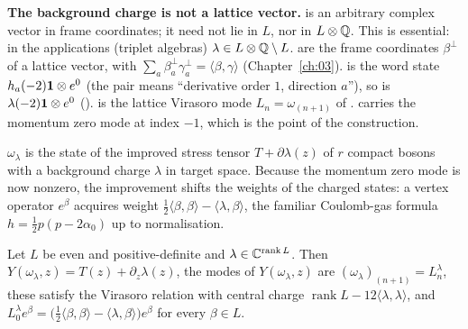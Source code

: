 \begin{dictionary}
\textbf{The background charge is not a lattice vector.}  is an arbitrary complex vector
in frame coordinates; it need not lie in $L$, nor in $L\otimes{\mathbb{Q}}$. This is essential: in the applications
(triplet algebras) $\lambda\in L\otimes{\mathbb{Q}}\setminus L$.  are the frame coordinates $\beta^\perp$
of a lattice vector, with $\sum_a\beta^\perp_a\gamma^\perp_a=\langle\beta,\gamma\rangle$ (Chapter~\ref{ch:03}).
 is the word state $h_a(-2)\mathbf{1}\otimes e^0$ (the pair  means
``derivative order $1$, direction $a$''), so  is $\lambda(-2)\mathbf{1}\otimes e^0$
().  is the lattice Virasoro mode $L_n=\omega_{(n+1)}$ of
.  carries the momentum zero mode at index $-1$, which is the point of the
construction.
\end{dictionary}

\begin{physics}
$\omega_\lambda$ is the state of the improved stress tensor $T+\partial\lambda(z)$ of $r$ compact bosons with a background
charge $\lambda$ in target space. Because the momentum zero mode is now nonzero, the improvement shifts the weights of
the charged states: a vertex operator $e^\beta$ acquires weight $\frac12\langle\beta,\beta\rangle-\langle\lambda,\beta\rangle$, the
familiar Coulomb-gas formula $h=\frac12p(p-2\alpha_0)$ up to normalisation.
\end{physics}

\begin{theorem}\label{l05:thm:latbg}
Let $L$ be even and positive-definite and $\lambda\in{\mathbb{C}}^{\operatorname{rank}L}$. Then
$Y(\omega_\lambda,z)=T(z)+\partial_z\lambda(z)$, the modes of $Y(\omega_\lambda,z)$ are $(\omega_\lambda)_{(n+1)}=L^\lambda_n$, these
satisfy the Virasoro relation with central charge $\operatorname{rank}L-12\langle\lambda,\lambda\rangle$, and
$L^\lambda_0e^\beta=\big(\frac12\langle\beta,\beta\rangle-\langle\lambda,\beta\rangle\big)e^\beta$ for every $\beta\in L$.
\end{theorem}

